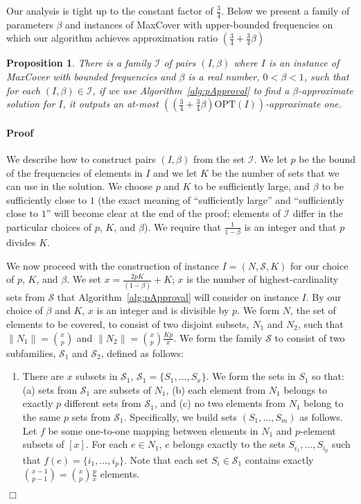 \documentclass[11pt]{article}
\newcommand{\OPT}{{{{\mathrm{OPT}}}}}
\newtheorem{proposition}[theorem]{Proposition}
\newenvironment{proof}{\paragraph{Proof}}{\hfill$\Box$\medskip}
\newcommand{\calI}{{{\mathcal{I}}}}
\newcommand{\calS}{{{\mathcal{S}}}}
\begin{document}
Our analysis is tight up to the constant factor of $\frac{3}{4}$.
Below we present a family of parameters $\beta$ and instances of
MaxCover with upper-bounded frequencies on which our algorithm
achieves approximation ratio $(\frac{3}{4} + \frac{3}{4}\beta)$



\begin{proposition}
  There is a family $\calI$ of pairs $(I,\beta)$ where $I$ is an
  instance of MaxCover with bounded frequencies and $\beta$ is a real
  number, $0 < \beta < 1$, such that for each $(I,\beta) \in \calI$,
  if we use Algorithm~\ref{alg:pApproval} to find a
  $\beta$-approximate solution for $I$, it outputs an at-most
  $((\frac{3}{4} + \frac{3}{4}\beta)\OPT(I))$-approximate one.
\end{proposition}
\begin{proof}
  We describe how to construct pairs $(I,\beta)$ from the set
  $\calI$. We let $p$ be the bound of the frequencies of elements in
  $I$ and we let $K$ be the number of sets that we can use in the solution. We choose
  $p$ and $K$ to be sufficiently large, and $\beta$ to be sufficiently
  close to $1$ (the exact meaning of ``sufficiently large'' and
  ``sufficiently close to $1$'' will become clear at the end of the
  proof; elements of $\calI$ differ in the particular choices of $p$,
  $K$, and $\beta$).  We require that $\frac{1}{1-\beta}$ is an
  integer and that $p$ divides $K$.

  We now proceed with the construction of instance $I = (N,\calS,K)$
  for our choice of $p$, $K$, and $\beta$.  We set $x = \frac{2p K}{(1
    - \beta)} + K$; $x$ is the number of highest-cardinality sets from
  $\calS$ that Algorithm~\ref{alg:pApproval} will consider on instance
  $I$. By our choice of $\beta$ and $K$, $x$ is an integer and is
  divisible by $p$.  We form $N$, the set of elements to be covered,
  to consist of two disjoint subsets, $N_1$ and $N_2$, such that
  $\|N_1\| = {x \choose p}$ and $\|N_2\| = {x \choose p}
  \frac{Kp}{x}$.  We form the family $\calS$ to consist of two
  subfamilies, $\calS_1$ and $\calS_2$, defined as follows:
  \begin{enumerate}
  \item There are $x$ subsets in $\calS_1$, $\calS_1 = \{S_1, \ldots,
    S_x\}$. We form the sets in $S_1$ so that: (a) sets from $\calS_1$
    are subsets of $N_1$, (b) each element from $N_1$ belongs to
    exactly $p$ different sets from $\calS_1$, and (c) no two elements
    from $N_1$ belong to the same $p$ sets from $\calS_1$.
    Specifically, we build sets $(S_1, \ldots, S_m)$ as follows. Let
    $f$ be some one-to-one mapping between elements in $N_1$ and
    $p$-element subsets of $[x]$. For each $e \in N_1$, $e$ belongs
    exactly to the sets $S_{i_1}, \ldots, S_{i_p}$ such that $f(e) =
    \{i_1, \ldots, i_p\}$.  Note that each set $S_i \in \calS_1$
    contains exactly ${x-1 \choose p-1} = {x \choose p}\frac{p}{x}$
    elements.


\end{enumerate}
\end{proof}
\end{document}
